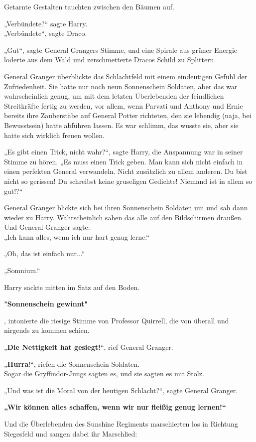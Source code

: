 {Getarnte Gestalten tauchten zwischen den Bäumen auf.

„Verbündete?“ sagte Harry.\\ „Verbündete“, sagte Draco.

„Gut“, sagte General Grangers Stimme, und eine Spirale aus grüner Energie loderte aus dem Wald und zerschmetterte Dracos Schild zu Splittern.

General Granger überblickte das Schlachtfeld mit einem eindeutigen Gefühl der Zufriedenheit. Sie hatte nur noch neun Sonnenschein Soldaten, aber das war wahrscheinlich genug, um mit dem letzten Überlebenden der feindlichen Streitkräfte fertig zu werden, vor allem, wenn Parvati und Anthony und Ernie bereits ihre Zauberstäbe auf General Potter richteten, den sie lebendig (naja, bei Bewusstsein) hatte abführen lassen. Es war schlimm, das wusste sie, aber sie hatte sich wirklich freuen wollen.

„Es gibt einen Trick, nicht wahr?“, sagte Harry, die Anspannung war in seiner Stimme zu hören. „Es muss einen Trick geben. Man kann sich nicht einfach in einen perfekten General verwandeln. Nicht zusätzlich zu allem anderen. Du bist nicht so gerissen! Du schreibst keine gruseligen Gedichte! Niemand ist in allem so gut!?“

General Granger blickte sich bei ihren Sonnenschein Soldaten um und sah dann wieder zu Harry. Wahrscheinlich sahen das alle auf den Bildschirmen draußen. Und General Granger sagte:\\ „Ich kann alles, wenn ich nur hart genug lerne.“

„Oh, das ist einfach nur...“

„Somnium.“

Harry sackte mitten im Satz auf den Boden.

\textbf{"Sonnenschein gewinnt"}

, intonierte die riesige Stimme von Professor Quirrell, die von überall und nirgends zu kommen schien.

„\textbf{Die Nettigkeit hat gesiegt!}“, rief General Granger.

„\textbf{Hurra}!“, riefen die Sonnenschein-Soldaten.\\ Sogar die Gryffindor-Jungs sagten es, und sie sagten es mit Stolz.

„Und was ist die Moral von der heutigen Schlacht?“, sagte General Granger.

\textbf{„Wir können alles schaffen, wenn wir nur fleißig genug lernen!“}

Und die Überlebenden des Sunshine Regiments marschierten los in Richtung Siegesfeld und sangen dabei ihr Marschlied:

}
